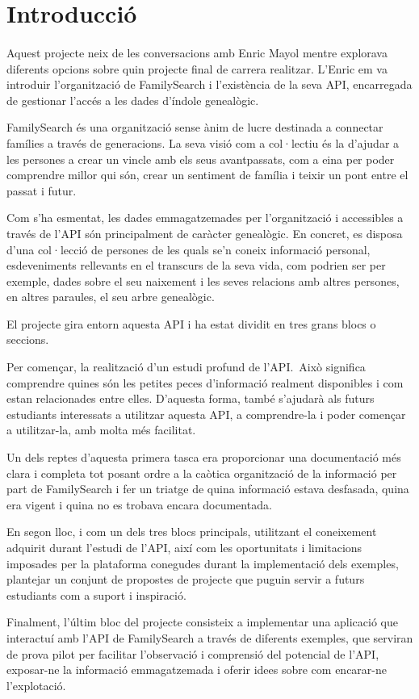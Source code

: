 \section{Introducció}

    \paragraph{}
    Aquest projecte neix de les conversacions amb Enric Mayol mentre explorava di\-fe\-rents opcions sobre quin projecte final de carrera realitzar. L’Enric em va introduir l'organització de FamilySearch i l'existència de la seva \gls{API}, encarregada de gestionar l’accés a les dades d’índole genealògic.

    \gls{FamilySearch} és una organització sense ànim de lucre destinada a connectar famílies a través de generacions. La seva visió com a col·lectiu és la d'ajudar a les persones a crear un vincle amb els seus avantpassats, com a eina per poder comprendre millor qui són, crear un sentiment de família i teixir un pont entre el passat i futur.

    Com s'ha esmentat, les dades emmagatzemades per l'organització i accessibles a través de l'\gls{API} són principalment de caràcter genealògic. En concret, es disposa d'una col·lecció de persones de les quals se'n coneix informació personal, esdeveniments rellevants en el transcurs de la seva vida, com podrien ser per exemple, dades sobre el seu naixement i les seves relacions amb altres persones, en altres paraules, el seu arbre genealògic.

    El projecte gira entorn aquesta \gls{API} i ha estat dividit en tres grans blocs o seccions.

    Per començar, la realització d'un estudi profund de l'\gls{API}.\ Això significa comprendre quines són les petites peces d’informació realment disponibles i com estan relacionades entre elles. D'aquesta forma, també s'ajudarà als futurs estudiants interessats a utilitzar aquesta API, a comprendre-la i poder començar a utilitzar-la, amb molta més facilitat.

    Un dels reptes d'aquesta primera tasca era proporcionar una documentació més clara i completa tot posant ordre a la caòtica organització de la informació per part de FamilySearch i fer un triatge de quina informació estava desfasada, quina era vigent i quina no es trobava encara documentada.

    En segon lloc, i com un dels tres blocs principals, utilitzant el coneixement adquirit durant l’estudi de l'\gls{API}, així com les oportunitats i limitacions imposades per la plataforma conegudes durant la implementació dels exemples, plantejar un conjunt de propostes de projecte que puguin servir a futurs estudiants com a suport i inspiració.

    Finalment, l’últim bloc del projecte consisteix a implementar una aplicació que interactuí amb l'\gls{API} de FamilySearch a través de diferents exemples, que serviran de prova pilot per facilitar l'observació i comprensió del potencial de l'\gls{API}, exposar-ne la informació emmagatzemada i oferir idees sobre com encarar-ne l'explotació.
